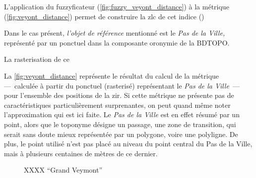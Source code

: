 L’application du fuzzyficateur (\autoref{fig:fuzzy_veyont_distance}) à
la métrique (\autoref{fig:veyont_distance}) permet de construire la
\ac{zlc} de cet indice ()



Dans le cas présent, \emph{l'objet de référence} mentionné est le
\emph{Pas de la Ville,} représenté par un ponctuel dans la composante
oronymie de la BDTOPO.


La rasterisation de ce



La \autoref{fig:veyont_distance} représente le résultat du calcul de
la métrique  ---~calculée à partir du ponctuel
(rasterisé) représentant le \emph{Pas de la Ville}~--- pour l'ensemble
des positions de la \ac{zir}. Si cette métrique ne présente pas de
caractéristiques particulièrement surprenantes, on peut quand même
noter l'approximation qui est ici faite. Le \emph{Pas de la Ville} est
en effet résumé par un point, alors que le toponyme désigne un
passage, une zone de transition, qui serait sans doute mieux
représentée par un polygone, voire une polyligne. De plus, le point
utilisé n'est pas placé au niveau du point central du Pas de la Ville,
mais à plusieurs centaines de mètres de ce dernier.


\begin{figure}
  \centering
  
  \caption{XXXX \enquote{Grand Veymont}}
  \label{fig:ZLC_GrandVeymont_9}
\end{figure}


